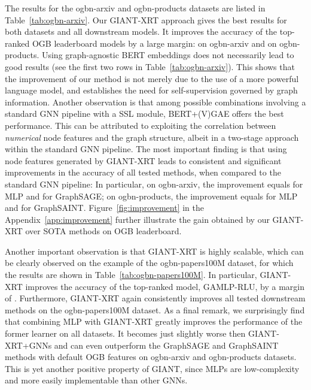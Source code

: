 \documentclass{article} \usepackage{iclr2022_conference,times}
\begin{document}
The results for the ogbn-arxiv and ogbn-products datasets are listed in Table~\ref{tab:ogbn-arxiv}. Our GIANT-XRT approach gives the best results for both datasets and all downstream models. It improves the accuracy of the top-ranked OGB leaderboard models by a large margin:   on ogbn-arxiv and  on ogbn-products. Using graph-agnostic BERT embeddings does not necessarily lead to good results (see the first two rows in Table~\ref{tab:ogbn-arxiv}). This shows that the improvement of our method is not merely due to the use of a more powerful language model, and establishes the need for self-supervision governed by graph information.
Another observation is that among possible combinations involving a standard GNN pipeline with a SSL module, BERT+(V)GAE offers the best performance. This can be attributed to exploiting the correlation between \emph{numerical} node features and the graph structure, albeit in a two-stage approach within the standard GNN pipeline. The most important finding is that using node features generated by GIANT-XRT leads to consistent and significant improvements in the accuracy of all tested methods, when compared to the standard GNN pipeline: In particular, on ogbn-arxiv, the improvement equals  for MLP and  for GraphSAGE; on ogbn-products, the improvement equals  for MLP and  for GraphSAINT. Figure~\ref{fig:improvement} in the Appendix~\ref{app:improvement} further illustrate the gain obtained by our GIANT-XRT over SOTA methods on OGB leaderboard.

Another important observation is that GIANT-XRT is highly scalable, which can be clearly observed on the example of the ogbn-papers100M dataset, for which the results are shown in Table~\ref{tab:ogbn-papers100M}. In particular, GIANT-XRT improves the accuracy of the top-ranked model, GAMLP-RLU, by a margin of . Furthermore, GIANT-XRT again consistently improves all tested downstream methods on the ogbn-papers100M dataset. As a final remark, we surprisingly find that combining MLP with GIANT-XRT greatly improves the performance of the former learner on all datasets. It becomes just slightly worse then GIANT-XRT+GNNs and can even outperform the GraphSAGE and GraphSAINT methods with default OGB features on ogbn-arxiv and ogbn-products datasets. This is yet another positive property of GIANT, since MLPs are low-complexity and more easily implementable than other GNNs.
\end{document}
